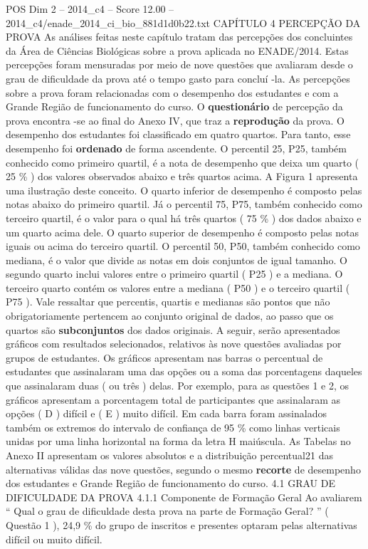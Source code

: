 \begin{textsample}{POS Dim 2 – 2014\_c4 – Score 12.00 – 2014\_c4/enade\_2014\_ci\_bio\_881d1d0b22.txt}  \label{ex:f2_pos_113}
CAPÍTULO 4 PERCEPÇÃO DA PROVA As análises feitas neste capítulo tratam das percepções dos concluintes da Área de Ciências Biológicas sobre a prova aplicada no ENADE/2014.
Estas percepções foram mensuradas por meio de nove questões que avaliaram desde o grau de dificuldade da prova até o tempo gasto para concluí -la.
As percepções sobre a prova foram relacionadas com o desempenho dos estudantes e com a Grande Região de funcionamento do curso.
O \textbf{questionário} de percepção da prova encontra -se ao final do Anexo IV, que traz a \textbf{reprodução} da prova.
O desempenho dos estudantes foi classificado em quatro quartos.
Para tanto, esse desempenho foi \textbf{ordenado} de forma ascendente.
O percentil 25, P25, também conhecido como primeiro quartil, é a nota de desempenho que deixa um quarto ( 25 \% ) dos valores observados abaixo e três quartos acima.
A Figura 1 apresenta uma ilustração deste conceito.
O quarto inferior de desempenho é composto pelas notas abaixo do primeiro quartil.
Já o percentil 75, P75, também conhecido como terceiro quartil, é o valor para o qual há três quartos ( 75 \% ) dos dados abaixo e um quarto acima dele.
O quarto superior de desempenho é composto pelas notas iguais ou acima do terceiro quartil.
O percentil 50, P50, também conhecido como mediana, é o valor que divide as notas em dois conjuntos de igual tamanho.
O segundo quarto inclui valores entre o primeiro quartil ( P25 ) e a mediana.
O terceiro quarto contém os valores entre a mediana ( P50 ) e o terceiro quartil ( P75 ).
Vale ressaltar que percentis, quartis e medianas são pontos que não obrigatoriamente pertencem ao conjunto original de dados, ao passo que os quartos são \textbf{subconjuntos} dos dados originais.
A seguir, serão apresentados gráficos com resultados selecionados, relativos às nove questões avaliadas por grupos de estudantes.
Os gráficos apresentam nas barras o percentual de estudantes que assinalaram uma das opções ou a soma das porcentagens daqueles que assinalaram duas ( ou três ) delas.
Por exemplo, para as questões 1 e 2, os gráficos apresentam a porcentagem total de participantes que assinalaram as opções ( D ) difícil e ( E ) muito difícil.
Em cada barra foram assinalados também os extremos do intervalo de confiança de 95 \% como linhas verticais unidas por uma linha horizontal na forma da letra H maiúscula.
As Tabelas no Anexo II apresentam os valores absolutos e a distribuição percentual21 das alternativas válidas das nove questões, segundo o mesmo \textbf{recorte} de desempenho dos estudantes e Grande Região de funcionamento do curso. 4.1 GRAU DE DIFICULDADE DA PROVA 4.1.1 Componente de Formação Geral Ao avaliarem “ Qual o grau de dificuldade desta prova na parte de Formação Geral? ” ( Questão 1 ), 24,9 \% do grupo de inscritos e presentes optaram pelas alternativas difícil ou muito difícil.

\end{textsample}
